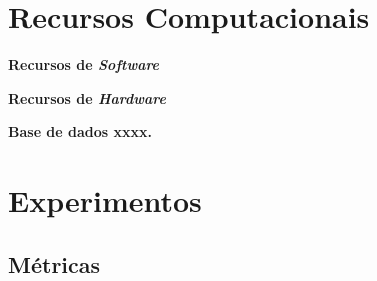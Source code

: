 
\section{Recursos Computacionais}

\textbf{Recursos de \textit{Software}}


\textbf{Recursos de \textit{Hardware}}


\textbf{Base de dados xxxx.}


\section{Experimentos}
\subsection{Métricas}

